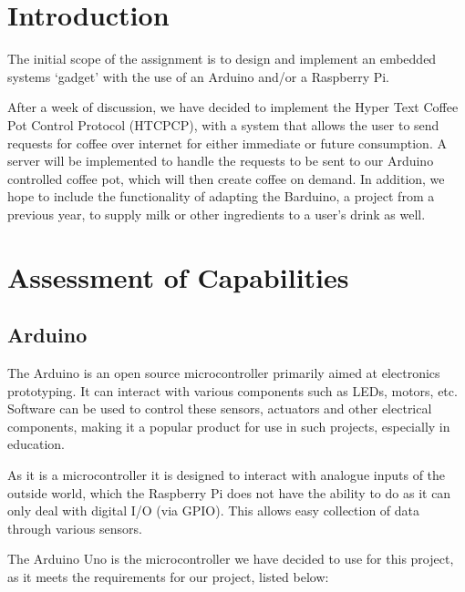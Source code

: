 \documentclass[11pt, a4paper]{article}
\begin{document}

\section{Introduction}
The initial scope of the assignment is to design and implement an embedded
systems `gadget' with the use of an Arduino and/or a Raspberry Pi.

After a week of discussion, we have decided to implement the Hyper Text 
Coffee Pot Control Protocol (HTCPCP)\cite{HTCPCP}, with a system that allows
the user to send requests for coffee over  internet for either immediate or
future consumption. A server will be implemented to handle the requests to be
sent to our Arduino controlled coffee pot, which will then create coffee on
demand. In addition, we hope to include the functionality of adapting the
Barduino, a project from a previous year, to supply milk or other ingredients to
a user’s drink as well.
\newpage


\section{Assessment of Capabilities}
\subsection{Arduino}
The Arduino is an open source microcontroller primarily aimed at electronics
prototyping. It can interact with various components such as LEDs, motors, etc.
Software can be used to control these sensors, actuators and other electrical
components, making it a popular product for use in such projects, especially in
education.

As it is a microcontroller it is designed to interact with analogue inputs of
the outside world, which the Raspberry Pi does not have the ability to do as it
can only deal with digital I/O (via GPIO). This allows easy collection of data
through various sensors. 

The Arduino Uno is the microcontroller we have decided to use for this project,
as it meets the requirements for our project, listed below:
\end{document}
